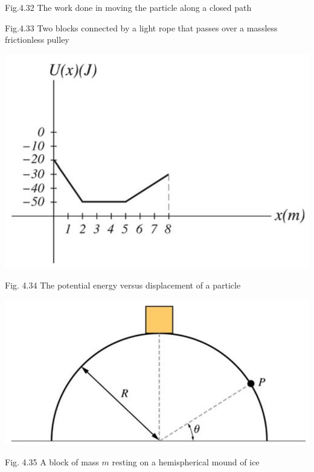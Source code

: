 \documentclass[10pt]{article}
\begin{document}
Fig.4.32 The work done in moving the particle along a closed path

Fig.4.33 Two blocks connected by a light rope that passes over a massless frictionless pulley

\begin{center}
\includegraphics[max width=\textwidth]{2024_09_13_db1f357d2aad0a03eb2eg-080}
\end{center}

Fig. 4.34 The potential energy versus displacement of a particle

\begin{center}
\includegraphics[max width=\textwidth]{2024_09_13_db1f357d2aad0a03eb2eg-080(1)}
\end{center}

Fig. 4.35 A block of mass $m$ resting on a hemispherical mound of ice
\end{document}
